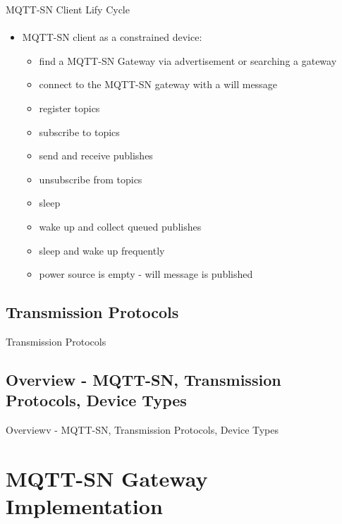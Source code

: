 \documentclass[10pt,aspectratio=\ratio,
compress
]{beamer}
\begin{document}
\begin{frame}{MQTT-SN Client Lify Cycle}\framesubtitle{}
	\begin{itemize}
		\item MQTT-SN client as a constrained device:
		\begin{itemize}
			\item find a MQTT-SN Gateway via advertisement or searching a gateway
			\item connect to the MQTT-SN gateway with a will message
			\item register topics
			\item subscribe to topics
			\item send and receive publishes
			\item unsubscribe from topics
			\item sleep 
			\item wake up and collect queued publishes
			\item sleep and wake up frequently
			\item power source is empty - will message is published
		\end{itemize}
			\end{itemize}
\end{frame}

\subsection{Transmission Protocols}
\begin{frame}{Transmission Protocols}\framesubtitle{}
\end{frame}

\subsection{Overview - MQTT-SN, Transmission Protocols, Device Types}
\begin{frame}{Overviewv - MQTT-SN, Transmission Protocols, Device Types}\framesubtitle{}
\end{frame}

\section{MQTT-SN Gateway Implementation}
\end{document}
